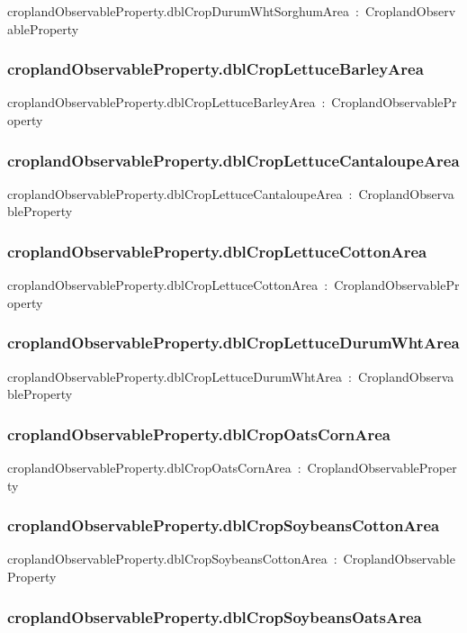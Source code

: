 \documentclass{article}
\begin{document}
croplandObservableProperty.dblCropDurumWhtSorghumArea~:~CroplandObservableProperty

\subsubsection*{croplandObservableProperty.dblCropLettuceBarleyArea}

croplandObservableProperty.dblCropLettuceBarleyArea~:~CroplandObservableProperty

\subsubsection*{croplandObservableProperty.dblCropLettuceCantaloupeArea}

croplandObservableProperty.dblCropLettuceCantaloupeArea~:~CroplandObservableProperty

\subsubsection*{croplandObservableProperty.dblCropLettuceCottonArea}

croplandObservableProperty.dblCropLettuceCottonArea~:~CroplandObservableProperty

\subsubsection*{croplandObservableProperty.dblCropLettuceDurumWhtArea}

croplandObservableProperty.dblCropLettuceDurumWhtArea~:~CroplandObservableProperty

\subsubsection*{croplandObservableProperty.dblCropOatsCornArea}

croplandObservableProperty.dblCropOatsCornArea~:~CroplandObservableProperty

\subsubsection*{croplandObservableProperty.dblCropSoybeansCottonArea}

croplandObservableProperty.dblCropSoybeansCottonArea~:~CroplandObservableProperty

\subsubsection*{croplandObservableProperty.dblCropSoybeansOatsArea}
\end{document}
